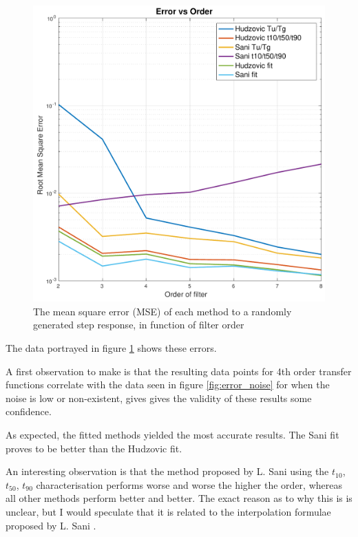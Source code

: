\begin{figure}
    \includegraphics[width=\linewidth]{images/error_order}
    \caption{The mean square error (MSE) of each method to a randomly generated step response, in function of filter order}
    \label{fig:error_order}
\end{figure}

The data portrayed in figure \ref{fig:error_order} shows these errors.

A first observation to make is that the  resulting  data  points  for  4th order
transfer  functions correlate with the data seen in figure \ref{fig:error_noise}
for when the noise is low  or  non-existent,  gives  gives the validity of these
results some confidence.

As expected, the fitted methods  yielded the most accurate results. The Sani fit
proves  to be better than the Hudzovic fit.

An interesting observation is that the method proposed by L. Sani\cite{ref:sani}
using the $t_{10}$, $t_{50}$, $t_{90}$ characterisation performs worse and worse
the  higher  the order, whereas all other methods perform better and better. The
exact reason as to why this is is unclear,  but  I  would  speculate  that it is
related  to  the interpolation formulae proposed by L. Sani  .




